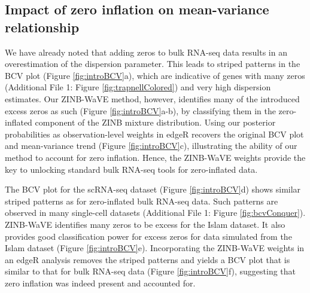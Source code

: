 \documentclass{bmcart}
\newcommand{\RPack}[1]{\textsf{#1}}
\newcommand{\fanny}[1]{\textcolor{blue}{*** FP: #1}}
\newcommand{\lc}[1]{\textcolor{ao}{*** LC: #1}}
\begin{document}
\subsection*{Impact of zero inflation on mean-variance relationship}
We have already noted that adding zeros to bulk RNA-seq data results in an overestimation of the dispersion parameter. This leads to striped patterns in the BCV plot (Figure \ref{fig:introBCV}a), which are indicative of genes with many zeros (Additional File 1: Figure \ref{fig:trapnellColored}) and very high dispersion estimates. Our ZINB-WaVE method, however, identifies many of the introduced excess zeros as such (Figure \ref{fig:introBCV}a-b), by classifying them in the zero-inflated component of the ZINB mixture distribution. Using our posterior probabilities as observation-level weights in \RPack{edgeR} recovers the original BCV plot and mean-variance trend (Figure \ref{fig:introBCV}c), illustrating the ability of our method to account for zero inflation. Hence, the ZINB-WaVE weights provide the key to unlocking standard bulk RNA-seq tools for zero-inflated data. 

The BCV plot for the \citet{Islam2011} scRNA-seq dataset (Figure \ref{fig:introBCV}d) shows similar striped patterns as for zero-inflated bulk RNA-seq data. Such patterns are observed in many single-cell datasets (Additional File 1: Figure \ref{fig:bcvConquer}). 
ZINB-WaVE identifies many zeros to be excess for the Islam dataset. It also provides good classification power for excess zeros for data simulated from the Islam dataset (Figure \ref{fig:introBCV}e). Incorporating the ZINB-WaVE weights in an \RPack{edgeR} analysis removes the striped patterns and yields a BCV plot that is similar to that for bulk RNA-seq data (Figure \ref{fig:introBCV}f), suggesting that zero inflation was indeed present and accounted for.
\end{document}

